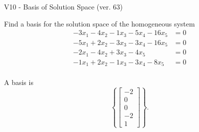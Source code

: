 \begin{exercise}
  \begin{exerciseTitle}V10 - Basis of Solution Space (ver. 63)\end{exerciseTitle}
  \begin{exerciseStatement}
    Find a basis for the solution space of the homogeneous system 
\begin{align*}
 -3 x_ 1 -4 x_ 2 -1 x_ 3 -5 x_ 4 -16 x_ 5 &= 0  \\ 
  -5 x_ 1 + 2 x_ 2 -3 x_ 3 -3 x_ 4 -16 x_ 5 &= 0  \\ 
  -2 x_ 1 -4 x_ 2 + 3 x_ 3 -4 x_ 5 &= 0  \\ 
  -1 x_ 1 + 2 x_ 2 -1 x_ 3 -3 x_ 4 -8 x_ 5 &= 0  \\ 
 \end{align*}


 
  \end{exerciseStatement}

  \begin{exerciseAnswer}
   A basis is   
\[\left\{\left[\begin{array}{c}
-2 \\
0 \\
0 \\
-2 \\
1
\end{array}\right]\right\}.\]

  


  \end{exerciseAnswer}
\end{exercise}